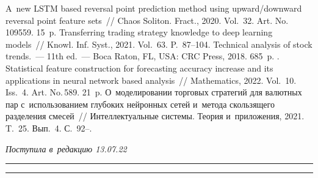 {\begin{multicols}{2}
{{\begin{thebibliography}{99}
 A~new LSTM based 
reversal point prediction method using upward/downward reversal point feature sets~// Chaos 
Soliton. Fract., 2020. Vol.~32. Art. No.\,109559. 15~p.
 Transferring trading strategy knowledge to deep learning 
models~// Knowl. Inf. Syst., 2021. Vol.~63. P.~87--104.
 Technical analysis of stock trends.~--- 11th 
ed.~--- Boca Raton, FL, USA: CRC Press, 2018. 685~p.
. Statistical feature construction for forecasting accuracy 
increase and its applications in neural network based analysis~// Mathematics, 2022. Vol.~10. 
Iss.~4. Art. No.\,589. 21~p.
 О~моделировании торговых стратегий для валютных пар 
с~использованием глубоких нейронных сетей и~метода скользящего разделения смесей~// 
Интеллектуальные сис\-те\-мы. Тео\-рия и~приложения, 2021. T.~25. Вып.~4. С.~92--. 

\end{thebibliography}

 }
 }

\end{multicols}

\vspace*{-10pt}

\hfill{\small\textit{Поступила в~редакцию 13.07.22}}

\vspace*{8pt}




\hrule

\vspace*{2pt}

\hrule


\def\tit{INCREASING FOREX TRADING PROFITABILITY\\ WITH~LSTM CANDLESTICK PATTERN 
RECOGNITION\\ AND~TICK VOLUME INDICATOR}


\def\titkol{Increasing FOREX trading profitability with~LSTM candlestick pattern 
recognition and~tick volume indicator}


}
